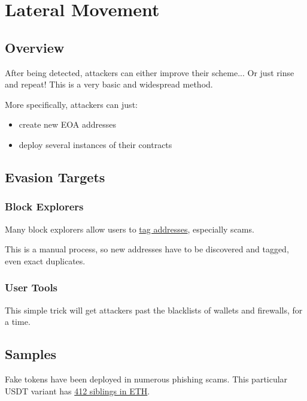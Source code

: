 \section{Lateral Movement} \label{sec:lateral-movement}

\subsection{Overview}

After being detected, attackers can either improve their scheme... Or just rinse and repeat!
This is a very basic and widespread method.

More specifically, attackers can just:

\begin{itemize}
\item{create new EOA addresses}
\item{deploy several instances of their contracts}
\end{itemize}

\subsection{Evasion Targets}

\subsubsection{Block Explorers}

Many block explorers allow users to \href{https://etherscan.io/address/0x00000c07575bb4e64457687a0382b4d3ea470000}{tag addresses}, especially scams.

This is a manual process, so new addresses have to be discovered and tagged, even exact duplicates.

\subsubsection{User Tools}

This simple trick will get attackers past the blacklists of wallets and firewalls, for a time.

\subsection{Samples}

Fake tokens have been deployed in numerous phishing scams.
This particular USDT variant has \href{https://etherscan.io/find-similar-contracts?a=0xA15B3d31F1f5D544933C35eB00568Ead238B4f63&m=low&ps=25&mt=1}{412 siblings in ETH}.

